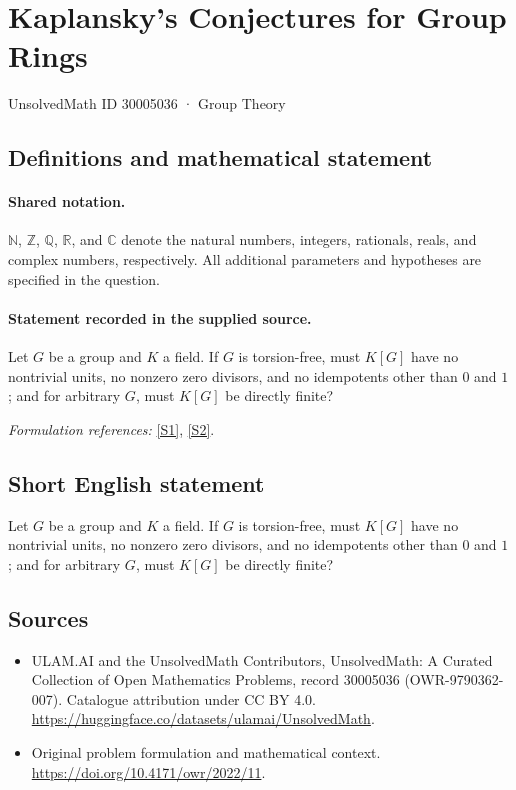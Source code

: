 \documentclass[11pt]{article}
\newcommand{\sref}[2]{\hyperlink{source:#1:#2}{[S#2]}}
\begin{document}
\setcounter{section}{30005035}
\section{Kaplansky's Conjectures for Group Rings}\label{30005036}
{\small UnsolvedMath ID 30005036 · Group Theory}
\subsection{Definitions and mathematical statement}

\paragraph{Shared notation.}$\mathbb N$, $\mathbb Z$, $\mathbb Q$, $\mathbb R$, and $\mathbb C$ denote the natural numbers, integers, rationals, reals, and complex numbers, respectively. All additional parameters and hypotheses are specified in the question.


\paragraph{Statement recorded in the supplied source.}
Let $G$ be a group and $K$ a field. If $G$ is torsion-free, must $K[G]$ have no nontrivial units, no nonzero zero divisors, and no idempotents other than $0$ and $1$; and for arbitrary $G$, must $K[G]$ be directly finite?
\par\smallskip\textit{Formulation references:} \sref{30005036}{1}, \sref{30005036}{2}.
\subsection{Short English statement}
Let $G$ be a group and $K$ a field. If $G$ is torsion-free, must $K[G]$ have no nontrivial units, no nonzero zero divisors, and no idempotents other than $0$ and $1$; and for arbitrary $G$, must $K[G]$ be directly finite?
\subsection{Sources}
\begin{itemize}
\item[\hypertarget{source:30005036:1}{S1}] ULAM.AI and the UnsolvedMath Contributors, UnsolvedMath: A Curated Collection of Open Mathematics Problems, record 30005036 (OWR-9790362-007). Catalogue attribution under CC BY 4.0.
\url{https://huggingface.co/datasets/ulamai/UnsolvedMath}.
\item[\hypertarget{source:30005036:2}{S2}] Original problem formulation and mathematical context.
\url{https://doi.org/10.4171/owr/2022/11}.
\end{itemize}
\label{end:30005036}
\end{document}
